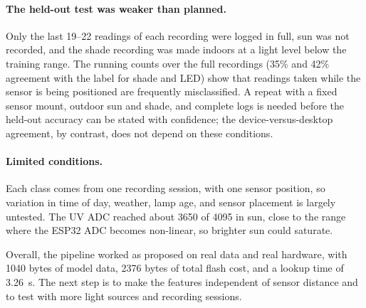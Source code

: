 \documentclass[10pt,a4paper,twocolumn]{article}
\begin{document}
\paragraph{The held-out test was weaker than planned.} Only the last 19--22 readings of each recording were logged in full, sun was not recorded, and the shade recording was made indoors at a light level below the training range. The running counts over the full recordings (35\% and 42\% agreement with the label for shade and LED) show that readings taken while the sensor is being positioned are frequently misclassified. A repeat with a fixed sensor mount, outdoor sun and shade, and complete logs is needed before the held-out accuracy can be stated with confidence; the device-versus-desktop agreement, by contrast, does not depend on these conditions.

\paragraph{Limited conditions.} Each class comes from one recording session, with one sensor position, so variation in time of day, weather, lamp age, and sensor placement is largely untested. The UV ADC reached about 3650 of 4095 in sun, close to the range where the ESP32 ADC becomes non-linear, so brighter sun could saturate.

Overall, the pipeline worked as proposed on real data and real hardware, with 1040 bytes of model data, 2376 bytes of total flash cost, and a lookup time of 3.26~\textmu s. The next step is to make the features independent of sensor distance and to test with more light sources and recording sessions.
\end{document}
